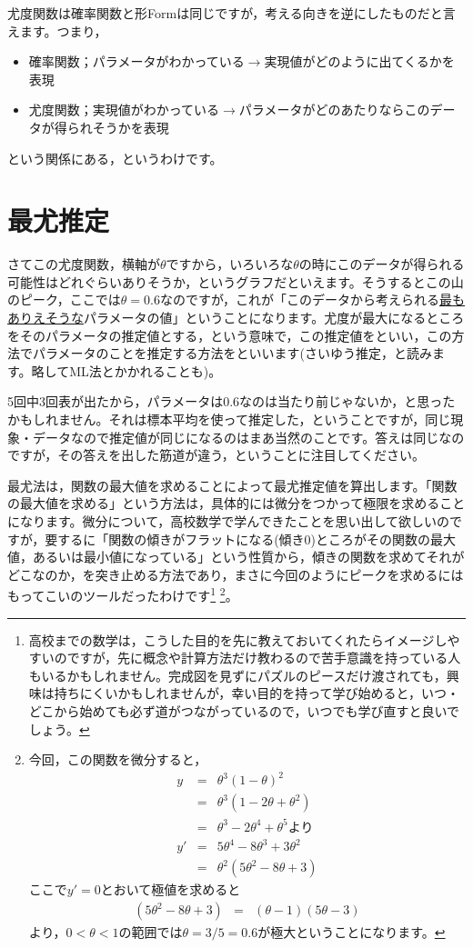 \documentclass{ltjsarticle}
\begin{document}
尤度関数は確率関数と形Formは同じですが，考える向きを逆にしたものだと言えます。つまり，
\begin{itemize}
    \item 確率関数；パラメータがわかっている$\to$実現値がどのように出てくるかを表現
    \item 尤度関数；実現値がわかっている$\to$パラメータがどのあたりならこのデータが得られそうかを表現
\end{itemize}
という関係にある，というわけです。

\section{最尤推定}
さてこの尤度関数，横軸が$\theta$ですから，いろいろな$\theta$の時にこのデータが得られる可能性はどれぐらいありそうか，というグラフだといえます。そうするとこの山のピーク，ここでは$\theta=0.6$なのですが，これが「このデータから考えられる\underline{最もありえそうな}パラメータの値」ということになります。尤度が最大になるところをそのパラメータの推定値とする，という意味で，この推定値をといい，この方法でパラメータのことを推定する方法をといいます(さいゆう推定，と読みます。略してML法とかかれることも)。

5回中3回表が出たから，パラメータは$0.6$なのは当たり前じゃないか，と思ったかもしれません。それは標本平均を使って推定した，ということですが，同じ現象・データなので推定値が同じになるのはまあ当然のことです。答えは同じなのですが，その答えを出した筋道が違う，ということに注目してください。

最尤法は，関数の最大値を求めることによって最尤推定値を算出します。「関数の最大値を求める」という方法は，具体的には微分をつかって極限を求めることになります。微分について，高校数学で学んできたことを思い出して欲しいのですが，要するに「関数の傾きがフラットになる(傾き$0$)ところがその関数の最大値，あるいは最小値になっている」という性質から，傾きの関数を求めてそれがどこなのか，を突き止める方法であり，まさに今回のようにピークを求めるにはもってこいのツールだったわけです\footnote{高校までの数学は，こうした目的を先に教えておいてくれたらイメージしやすいのですが，先に概念や計算方法だけ教わるので苦手意識を持っている人もいるかもしれません。完成図を見ずにパズルのピースだけ渡されても，興味は持ちにくいかもしれませんが，幸い目的を持って学び始めると，いつ・どこから始めても必ず道がつながっているので，いつでも学び直すと良いでしょう。}
\footnote{今回，この関数を微分すると，
\begin{eqnarray*}
    y &=& \theta^3(1-\theta)^2 \\
    & =& \theta^3(1-2\theta+\theta^2)\\
    &=& \theta^3 - 2\theta^4 + \theta^5 \mbox{より}\\
    y' &=& 5\theta^4 - 8\theta^3 + 3\theta^2\\
    &=& \theta^2(5\theta^2-8\theta+3)
\end{eqnarray*}
ここで$y'=0$とおいて極値を求めると
\begin{eqnarray*}
    (5\theta^2-8\theta+3) &=& (\theta -1)(5\theta -3)
\end{eqnarray*}
より，$0< \theta < 1$の範囲では$\theta=3/5=0.6$が極大ということになります。
}。
\end{document}
